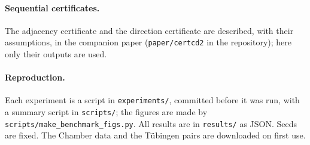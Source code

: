 \paragraph{Sequential certificates.} The adjacency certificate and the direction certificate
are described, with their assumptions, in the companion paper (\texttt{paper/certcd2} in the
repository); here only their outputs are used.

\paragraph{Reproduction.} Each experiment is a script in \texttt{experiments/}, committed
before it was run, with a summary script in \texttt{scripts/}; the figures are made by
\texttt{scripts/make\_benchmark\_figs.py}. All results are in \texttt{results/} as JSON.
Seeds are fixed. The Chamber data and the Tübingen pairs are downloaded on first use.
